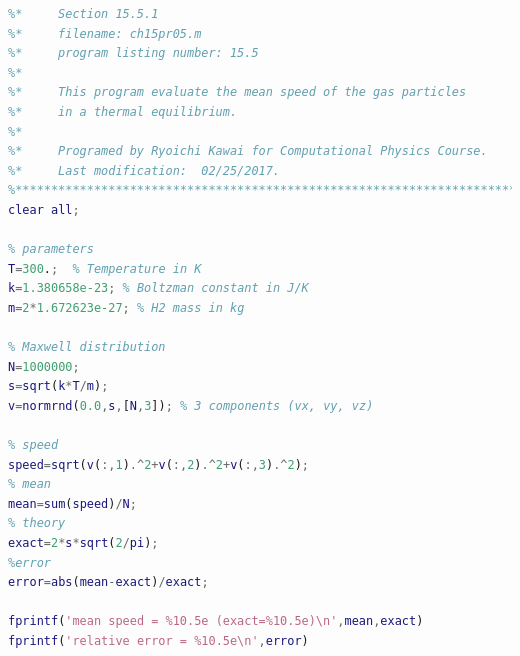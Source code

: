 \bigskip
\noindent
\program
\label{prog:mean_ke}
\footnotesize
\begin{lstlisting}[language=matlab]
%**************************************************************************
%*     Section 15.5.1                                                     *
%*     filename: ch15pr05.m                                               *
%*     program listing number: 15.5                                       *
%*                                                                        *
%*     This program evaluate the mean speed of the gas particles          *
%*     in a thermal equilibrium.                                          *
%*                                                                        *
%*     Programed by Ryoichi Kawai for Computational Physics Course.       *
%*     Last modification:  02/25/2017.                                    *
%**************************************************************************
clear all;

% parameters
T=300.;  % Temperature in K
k=1.380658e-23; % Boltzman constant in J/K
m=2*1.672623e-27; % H2 mass in kg

% Maxwell distribution
N=1000000;
s=sqrt(k*T/m);
v=normrnd(0.0,s,[N,3]); % 3 components (vx, vy, vz)

% speed
speed=sqrt(v(:,1).^2+v(:,2).^2+v(:,3).^2);
% mean
mean=sum(speed)/N;
% theory
exact=2*s*sqrt(2/pi);
%error
error=abs(mean-exact)/exact;

fprintf('mean speed = %10.5e (exact=%10.5e)\n',mean,exact)
fprintf('relative error = %10.5e\n',error)
\end{lstlisting}
\normalsize


